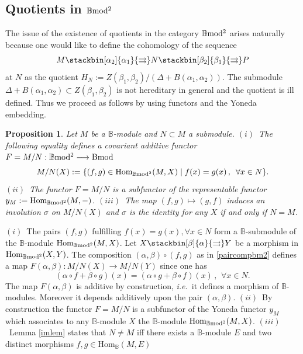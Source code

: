 \documentclass[12pt]{article}
\newtheorem{prop}[thm]{Proposition}
\def\Hom{{\rm Hom}}
\def\B{{\mathbb B}}
\def\qqq{\,,\,~\forall}
\newcommand{\ie}{{\it i.e.\/}\ }
\def\Hom {{\mbox{Hom}}}
\def\bm2{{\rm \B mod^2}}
\begin{document}
  
\subsection{Quotients in $\bm2$}\label{sectquotbm2}

The issue of the existence of quotients in the category $\bm2$ arises naturally because one would like to  define the cohomology of the sequence 
\begin{equation}	
\label{exactseqter}
M \stackbin[\alpha_2]{\alpha_1}{\rightrightarrows}N\stackbin[\beta_2]{\beta_1}{\rightrightarrows}P
\end{equation}
 at $N$ as the quotient $H_N:=Z(\beta_1,\beta_2)/(\Delta+B(\alpha_1,\alpha_2))$. The submodule $\Delta+B(\alpha_1,\alpha_2)\subset Z(\beta_1,\beta_2)$ is not hereditary in general and the  quotient is ill defined. Thus  we proceed as follows by using functors and the Yoneda embedding. 	
\begin{prop}\label{repfunctor} Let $M$ be a $\B$-module and $N\subset M$ a submodule. \newline
$(i)$~The following equality defines a covariant additive functor $F=M/N:\bm2\longrightarrow {\rm Bmod}$
\begin{equation}\label{covfunc}
	M/N(X):=\{(f,g)\in \Hom_{\bm2}(M,X)\mid f(x)=g(x)\qqq x\in N\}.
\end{equation}
$(ii)$~The functor $F=M/N$ is a subfunctor of the representable functor $y_M:=\Hom_\bm2(M,-)$.\newline
$(iii)$~The map $(f,g)\mapsto (g,f)$  induces an involution $\sigma$ on $M/N(X)$ and $\sigma$ is the identity for any $X$ if and only if $N=M$.
\end{prop}
\proof $(i)$~The pairs $(f,g)$ fulfilling $f(x)=g(x), \forall x\in N$ form a $\B$-submodule of the $\B$-module $\Hom_{\bm2}(M,X)$. Let $X\stackbin[\beta]{\alpha}{\rightrightarrows} Y$ be a morphism in $\Hom_{\bm2}(X,Y)$. The composition $(\alpha,\beta)\circ (f,g)$ as in \eqref{paircompbm2} defines a map $F(\alpha,\beta):M/N(X)\to M/N(Y)$ since one has
$$
(\alpha\circ f+\beta\circ g)(x)=(\alpha\circ g+\beta\circ f)(x)\qqq x\in N.
$$
The map $F(\alpha,\beta)$ is additive by construction, \ie it defines a morphism of $\B$-modules. Moreover it depends additively upon the pair $(\alpha,\beta)$. \newline
$(ii)$~By construction the functor $F=M/N$ is a subfunctor of the Yoneda functor $y_M$ which associates to any $\B$-module $X$ the $\B$-module $\Hom_\bm2(M,X)$.\newline
$(iii)$~Lemma \ref{imlem} states that $N\neq M$ iff there exists a $\B$-module $E$ and two distinct morphisms $f,g\in \Hom_\B(M,E)$
\end{document}
